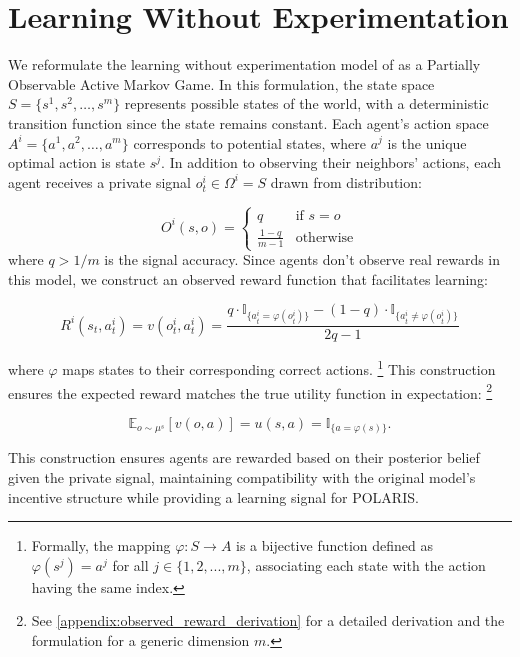 \section{Learning Without Experimentation}

We reformulate the learning without experimentation model of \citet{brandl2024} as a Partially Observable Active Markov Game. In this formulation, the state space $S = \{s^1, s^2, \ldots, s^m\}$ represents possible states of the world, with a deterministic transition function since the state remains constant. Each agent's action space $A^i = \{a^1, a^2, \ldots, a^m\}$ corresponds to potential states, where $a^j$ is the unique optimal action is state $s^j$. In addition to observing their neighbors' actions, each agent receives a private signal $o^i_t \in \Omega^i = S$ drawn from distribution:

\begin{equation*}
    O^i(s,o) =
    \begin{cases}
        q               & \text{if } s = o \\
        \frac{1-q}{m-1} & \text{otherwise}
    \end{cases}
\end{equation*}
where $q > 1/m$ is the signal accuracy. Since agents don't observe real rewards in this model, we construct an observed reward function that facilitates learning:

\begin{equation*}
    R^i(s_t, a^i_t) = v(o^i_t, a^i_t) = \frac{q \cdot \mathbb{I}_{\{a^i_t = \varphi(o^i_t)\}} - (1 - q) \cdot \mathbb{I}_{\{a^i_t \neq \varphi(o^i_t)\}}}{2q - 1}
\end{equation*}

where $\varphi$ maps states to their corresponding correct actions. \footnote{Formally, the mapping $\varphi: S \rightarrow A$ is a bijective function defined as $\varphi(s^j) = a^j$ for all $j \in \{1,2,...,m\}$, associating each state with the action having the same index.} This construction ensures the expected reward matches the true utility function in expectation: \footnote{See \ref{appendix:observed_reward_derivation} for a detailed derivation and the formulation for a generic dimension $m$.}

\begin{equation*}
    \mathbb{E}_{o \sim \mu^{s}}[v(o, a)] = u(s, a) = \mathbb{I}_{\{a = \varphi(s)\}}.
\end{equation*}


This construction ensures agents are rewarded based on their posterior belief given the private signal, maintaining compatibility with the original model's incentive structure while providing a learning signal for POLARIS.

